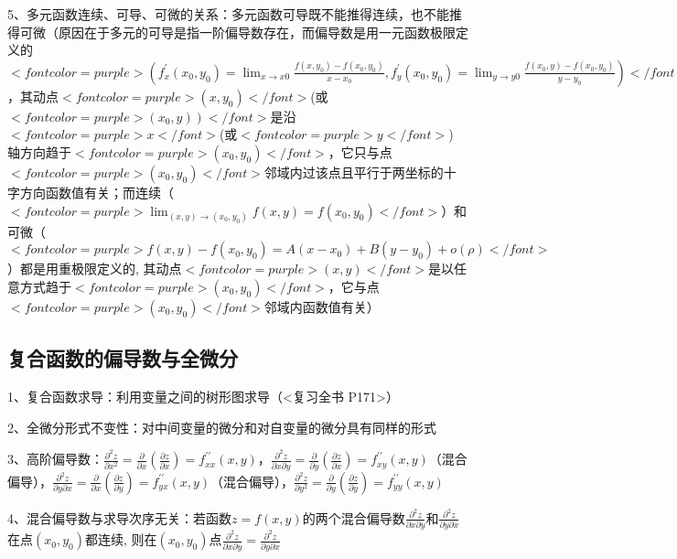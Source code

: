 5、多元函数连续、可导、可微的关系：多元函数可导既不能推得连续，也不能推得可微（原因在于多元的可导是指一阶偏导数存在，而偏导数是用一元函数极限定义的$ <font color=purple>\left(f_{x}^{\prime}\left(x_{0}\right.\right., \left.\left.y_{0}\right)=\lim_{x \rightarrow x{0}} \frac{f\left(x, y_{0}\right)-f\left(x_{0}, y_{0}\right)}{x-x_{0}}, f_{y}^{\prime}\left(x_{0}, y_{0}\right)=\lim_{y \rightarrow y{0}} \frac{f\left(x_{0}, y\right)-f\left(x_{0}, y_{0}\right)}{y-y_{0}}\right)</font> $，其动点$ <font color=purple>\left(x, y_{0}\right)</font> $(或$ <font color=purple>\left.\left(x_{0}, y\right)\right)</font> $是沿$ <font color=purple>x</font> $(或$ <font color=purple>y</font> $) 轴方向趋于$ <font color=purple>\left(x_{0}, y_{0}\right)</font> $，它只与点$ <font color=purple>\left(x_{0}, y_{0}\right)</font> $邻域内过该点且平行于两坐标的十字方向函数值有关；而连续（$ <font color=purple>\lim_{(x, y) \rightarrow\left(x_{0}, y_{0}\right)} f(x, y)=f\left(x_{0}, y_{0}\right)</font> $）和可微（$ <font color=purple>f(x, y)-f(x_{0},y_{0})=A\left(x-x_{0}\right)+B\left(y-y_{0}\right)+o(\rho)</font> $）都是用重极限定义的, 其动点$ <font color=purple>(x, y)</font> $是以任意方式趋于$ <font color=purple>\left(x_{0}, y_{0}\right)</font> $，它与点$ <font color=purple>\left(x_{0}, y_{0}\right)</font> $邻域内函数值有关）



\subsection{复合函数的偏导数与全微分}

1、复合函数求导：利用变量之间的树形图求导（<复习全书 P171>）

2、全微分形式不变性：对中间变量的微分和对自变量的微分具有同样的形式

3、高阶偏导数：$ \frac{\partial^{2} z}{\partial x^{2}}=\frac{\partial}{\partial x}\left(\frac{\partial z}{\partial x}\right)=f_{x x}^{\prime \prime}(x, y) $，$ \frac{\partial^{2} z}{\partial x \partial y}=\frac{\partial}{\partial y}\left(\frac{\partial z}{\partial x}\right)=f_{x y}^{\prime \prime}(x, y) $（混合偏导），$ \frac{\partial^{2} z}{\partial y \partial x}=\frac{\partial}{\partial x}\left(\frac{\partial z}{\partial y}\right)=f_{y x}^{\prime \prime}(x, y) $（混合偏导），$ \frac{\partial^{2} z}{\partial y^{2}}=\frac{\partial}{\partial y}\left(\frac{\partial z}{\partial y}\right)=f_{y y}^{\prime \prime}(x, y) $

4、混合偏导数与求导次序无关：若函数$ z=f(x, y) $的两个混合偏导数$ \frac{\partial^{2} z}{\partial x \partial y} $和$ \frac{\partial^{2} z}{\partial y \partial x} $在点$ \left(x_{0}, y_{0}\right) $都连续, 则在$ \left(x_{0}, y_{0}\right) $点$ \frac{\partial^{2} z}{\partial x \partial y}=\frac{\partial^{2} z}{\partial y \partial x} $

